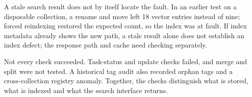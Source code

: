 A stale search result does not by itself locate the fault. In an earlier
test on a disposable collection, a rename and move left 18 vector
entries instead of nine; forced reindexing restored the expected count, so the index
was at fault. If index metadata already shows the new path, a stale
result alone does not establish an index defect; the response path and
cache need checking separately.

Not every check succeeded. Task-status and update checks failed, and merge
and split were not tested. A historical tag audit also recorded orphan tags
and a cross-collection registry anomaly. Together, the checks distinguish
what is stored, what is indexed and what the search interface returns.
